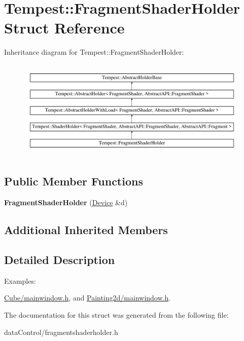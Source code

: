 \hypertarget{struct_tempest_1_1_fragment_shader_holder}{\section{Tempest\+:\+:Fragment\+Shader\+Holder Struct Reference}
\label{struct_tempest_1_1_fragment_shader_holder}
}
Inheritance diagram for Tempest\+:\+:Fragment\+Shader\+Holder\+:\begin{figure}[H]
\begin{center}
\leavevmode
\includegraphics[height=4.827586cm]{struct_tempest_1_1_fragment_shader_holder}
\end{center}
\end{figure}
\subsection*{Public Member Functions}
\begin{DoxyCompactItemize}
\item 
\hypertarget{struct_tempest_1_1_fragment_shader_holder_ad52a21ecb8c7cab703a57de1cf514433}{{\bfseries Fragment\+Shader\+Holder} (\hyperlink{class_tempest_1_1_device}{Device} \&d)}\label{struct_tempest_1_1_fragment_shader_holder_ad52a21ecb8c7cab703a57de1cf514433}

\end{DoxyCompactItemize}
\subsection*{Additional Inherited Members}


\subsection{Detailed Description}
\begin{Desc}
\item[Examples\+: ]\par
\hyperlink{_cube_2mainwindow_8h-example}{Cube/mainwindow.\+h}, and \hyperlink{_painting2d_2mainwindow_8h-example}{Painting2d/mainwindow.\+h}.\end{Desc}


The documentation for this struct was generated from the following file\+:\begin{DoxyCompactItemize}
\item 
data\+Control/fragmentshaderholder.\+h\end{DoxyCompactItemize}
